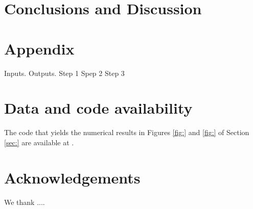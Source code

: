 \documentclass[a4paper]{article}
\begin{document}
\section{Conclusions and Discussion}\label{sec:discussion}

\appendix

\section{Appendix}\label{appendix}


\begin{algorithm}
\caption{Symbiosis model}
\label{alg:model}
\begin{algorithmic}[1]
 \renewcommand{\algorithmicrequire}{Input:}
 \renewcommand{\algorithmicensure}{Output:}
 \REQUIRE Inputs. \medskip
 \ENSURE Outputs.
\medskip \medskip
	\STATE Step 1
	\STATE Spep 2
	\STATE Step 3
\end{algorithmic}
\end{algorithm}



\section*{Data and code availability}

The code that yields the numerical results in Figures \ref{fig:} and \ref{fig:} of Section \ref{sec:} are available at \url{}.


\section*{Acknowledgements}

We thank ....



\end{document}
